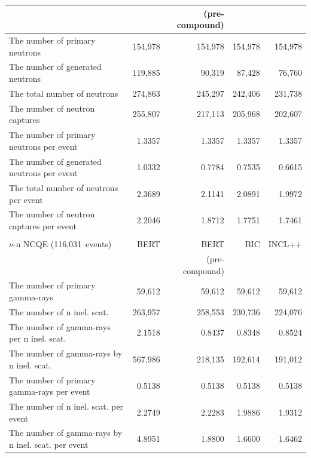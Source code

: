 \begin{table}[h]
\begin{tabular}{lrrrr}
		                                                    &         & (pre-compound) &         &         \\ \hline
		The number of primary neutrons                      & 154,978 &        154,978 & 154,978 & 154,978 \\
		The number of generated neutrons                    & 119,885 &         90,319 &  87,428 &  76,760 \\
		The total number of neutrons                        & 274,863 &        245,297 & 242,406 & 231,738 \\
		The number of neutron captures                      & 255,807 &        217,113 & 205,968 & 202,607 \\ \hline
		The number of primary neutrons per event            &  1.3357 &         1.3357 &  1.3357 &  1.3357 \\
		The number of generated neutrons per event          &  1.0332 &         0.7784 &  0.7535 &  0.6615 \\
		The total number of neutrons per event              &  2.3689 &         2.1141 &  2.0891 &  1.9972 \\
		The number of neutron captures per event            &  2.2046 &         1.8712 &  1.7751 &  1.7461 \\ \hline \hline
		&&& \\ \hline \hline
		$\nu$-n NCQE (116,031~events)                       &    BERT &           BERT &     BIC &  INCL++ \\
		                                                    &         & (pre-compound) &         &         \\ \hline
		The number of primary gamma-rays                    &  59,612 &         59,612 &  59,612 &  59,612 \\
		The number of n inel. scat.                         & 263,957 &        258,553 & 230,736 & 224,076 \\
		The number of gamma-rays per n inel. scat.          &  2.1518 &         0.8437 &  0.8348 &  0.8524 \\
		The number of gamma-rays by n inel. scat.           & 567,986 &        218,135 & 192,614 & 191,012 \\ \hline
		The number of primary gamma-rays per event          &  0.5138 &         0.5138 &  0.5138 &  0.5138 \\
		The number of n inel. scat. per event               &  2.2749 &         2.2283 &  1.9886 &  1.9312 \\
		The number of gamma-rays by n inel. scat. per event &  4.8951 &         1.8800 &  1.6600 &  1.6462 \\ \hline \hline
	\end{tabular}
\end{table}

